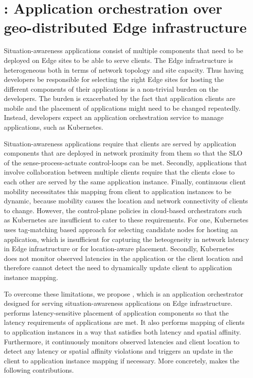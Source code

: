\chapter{\oneedge{}: Application orchestration over geo-distributed Edge infrastructure}
\label{sec:oneedge}

\par Situation-awareness applications consist of multiple components that need to be deployed on Edge sites to be able to serve clients. The Edge infrastructure is heterogeneous both in terms of network topology and site capacity. Thus having  developers be responsible for selecting the right Edge sites for hosting the different components of their applications is a non-trivial burden on the developers. The burden is exacerbated by the fact that application clients are mobile and the placement of applications might need to be changed repeatedly. Instead, developers expect an application orchestration service to manage applications, such as Kubernetes. 
\par Situation-awareness applications require that clients are served by application components that are deployed in network proximity from them so that the SLO of the sense-process-actuate control-loops can be met. Secondly, applications that involve collaboration between multiple clients require that the clients close to each other are served by the same application instance. Finally, continuous client mobility necessitates this mapping from client to application instances to be dynamic, because mobility causes the location and network connectivity of clients to change. However, the control-plane policies in cloud-based orchestrators such as Kubernetes  are insufficient to cater to these requirements. For one, Kubernetes uses tag-matching based approach for selecting candidate nodes for hosting an application, which is insufficient for capturing the heteogeneity in network latency in Edge infrastructure or for location-aware placement. Secondly, Kubernetes does not monitor observed latencies in the application or the client location and therefore cannot detect the need to dynamically update client to application instance mapping.
\par To overcome these limitations, we propose \oneedge{}, which is an application orchestrator designed for serving situation-awareness applications on Edge infrastructure. \oneedge{} performs latency-sensitive placement of application components so that the latency requirements of applications are met. It also performs mapping of clients to application instances in a way that satisfies both latency and spatial affinity. Furthermore, it continuously monitors observed latencies and client location to detect any latency or spatial affinity violations and triggers an update in the client to application instance mapping if necessary. More concretely, \oneedge{} makes the following contributions.
